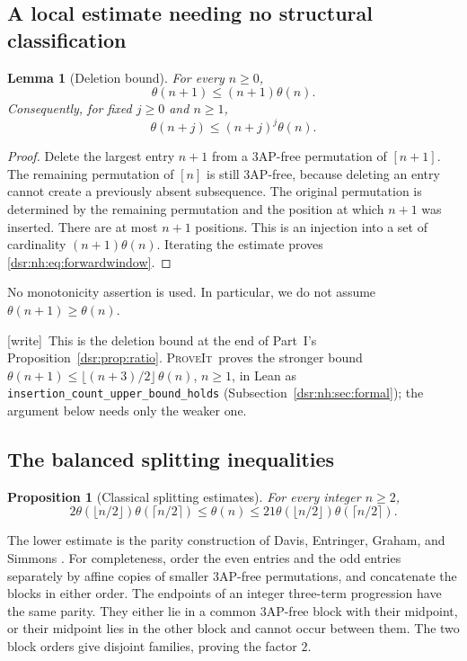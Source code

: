 \documentclass[11pt,a4paper]{article}
\numberwithin{equation}{section}
\newtheorem{lemma}[theorem]{Lemma}
\newtheorem{proposition}[theorem]{Proposition}
\theoremstyle{definition}
\theoremstyle{remark}
\newcommand{\repo}{\textsc{ProveIt}}
\newcommand{\wtag}{\textup{[write]}}
\newcommand{\lean}[1]{\nolinkurl{#1}}
\newcommand{\tht}{\theta}
\theoremstyle{definition}
\theoremstyle{plain}
\begin{document}
\subsection{A local estimate needing no structural classification}
\begin{lemma}[Deletion bound]
\label{dsr:nh:lem:deletion}
For every $n\ge0$,
\begin{equation}
\tht(n+1)\le(n+1)\tht(n).
\label{dsr:nh:eq:deletion}
\end{equation}
Consequently, for fixed $j\ge0$ and $n\ge1$,
\begin{equation}
\tht(n+j)\le (n+j)^j\tht(n).
\label{dsr:nh:eq:forwardwindow}
\end{equation}
\end{lemma}
\begin{proof}
Delete the largest entry $n+1$ from a 3AP-free permutation of $[n+1]$.
The remaining permutation of $[n]$ is still 3AP-free, because deleting an
entry cannot create a previously absent subsequence. The original
permutation is determined by the remaining permutation and the position at
which $n+1$ was inserted. There are at most $n+1$ positions. This is an
injection into a set of cardinality $(n+1)\tht(n)$. Iterating the estimate
proves \eqref{dsr:nh:eq:forwardwindow}.
\end{proof}
No monotonicity assertion is used. In particular, we do not assume
$\tht(n+1)\ge\tht(n)$.

\wtag\ This is the deletion bound at the end of Part~I's
Proposition~\ref{dsr:prop:ratio}. \repo\ proves the stronger bound
$\tht(n+1)\le\lfloor(n+3)/2\rfloor\,\tht(n)$, $n\ge1$, in Lean as
\lean{insertion_count_upper_bound_holds}
(Subsection~\ref{dsr:nh:sec:formal}); the argument below needs only the
weaker one.

\subsection{The balanced splitting inequalities}
\begin{proposition}[Classical splitting estimates]
\label{dsr:nh:prop:split}
For every integer $n\ge2$,
\begin{equation}
2\tht(\lfloor n/2\rfloor)\tht(\lceil n/2\rceil)
\le \tht(n)
\le21\tht(\lfloor n/2\rfloor)\tht(\lceil n/2\rceil).
\label{dsr:nh:eq:split}
\end{equation}
\end{proposition}
The lower estimate is the parity construction of Davis, Entringer, Graham,
and Simmons \cite{DEGS}. For completeness, order the even entries and the
odd entries separately by affine copies of smaller 3AP-free permutations,
and concatenate the blocks in either order. The endpoints of an integer
three-term progression have the same parity. They either lie in a common
3AP-free block with their midpoint, or their midpoint lies in the other
block and cannot occur between them. The two block orders give disjoint
families, proving the factor $2$.
\end{document}
